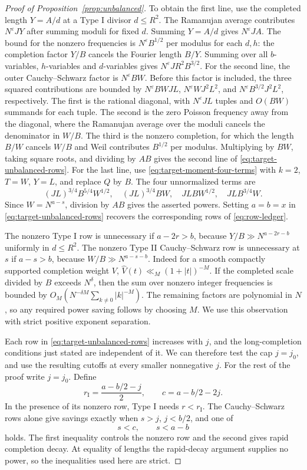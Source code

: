 \documentclass[11pt]{amsart}
\numberwithin{equation}{section}
\theoremstyle{remark}
\begin{document}
\begin{proof}[Proof of Proposition~\ref{prop:unbalanced}]
To obtain the first line, use the completed length \(Y=A/d\) at a
Type I divisor \(d\le R^2\). The Ramanujan average contributes
\(N^\varepsilon JY\) after summing moduli for fixed \(d\). Summing
\(Y=A/d\) gives \(N^\varepsilon JA\). The bound for the nonzero frequencies
is \(N^\varepsilon B^{1/2}\) per modulus for each \(d,h\): the completion
factor \(Y/B\) cancels the Fourier length \(B/Y\). Summing over all
\(b\)-variables, \(h\)-variables and \(d\)-variables gives
\(N^\varepsilon JR^2B^{3/2}\).
For the second line, the outer Cauchy--Schwarz factor is
\(N^\varepsilon BW\). Before this factor is included, the three squared
contributions are bounded by \(N^\varepsilon BWJL\),
\(N^\varepsilon WJ^2L^2\), and \(N^\varepsilon B^{3/2}J^2L^2\),
respectively. The first is the rational diagonal, with
\(N^\varepsilon JL\) tuples and \(O(BW)\) summands for each tuple.
The second is the zero Poisson frequency away from the diagonal,
where the Ramanujan average over the moduli cancels the denominator
in \(W/B\). The third is the nonzero completion, for which the
length \(B/W\) cancels \(W/B\) and Weil contributes \(B^{1/2}\) per
modulus. Multiplying by \(BW\), taking square roots, and dividing by
\(AB\) gives the second line of \eqref{eq:target-unbalanced-rows}.
For the last line, use \eqref{eq:target-moment-four-terms} with
\(k=2\), \(T=W\), \(Y=L\), and replace \(Q\) by \(B\). The four
unnormalized terms are
\[
 (JL)^{3/4}B^{5/4}W^{1/2},\quad (JL)^{3/4}BW,\quad
 JLBW^{1/2},\quad JLB^{3/4}W.
\]
Since \(W=N^{a-s}\), division by \(AB\) gives the asserted powers.
Setting \(a=b=x\) in \eqref{eq:target-unbalanced-rows} recovers
the corresponding rows of \eqref{eq:row-ledger}.

The nonzero Type I row is unnecessary if \(a-2r>b\), because
\(Y/B\gg N^{a-2r-b}\) uniformly in \(d\le R^2\).
The nonzero Type II Cauchy--Schwarz row is unnecessary at \(s\) if
\(a-s>b\), because \(W/B\gg N^{a-s-b}\).
Indeed for a smooth compactly supported completion weight \(V\),
\(\widehat V(t)\ll_M(1+|t|)^{-M}\). If the completed scale divided
by \(B\) exceeds \(N^\delta\), then the sum over nonzero integer
frequencies is bounded by \(O_M(N^{-\delta M}\sum_{k\ne0}|k|^{-M})\).
The remaining factors are polynomial in \(N\), so any required
power saving follows by choosing \(M\). We use this observation with
strict positive exponent separation.

Each row in \eqref{eq:target-unbalanced-rows} increases with \(j\),
and the long-completion conditions just stated are independent of it.
We can therefore test the cap \(j=j_0\), and use the resulting cutoffs
at every smaller nonnegative \(j\). For the rest of the proof write
\(j=j_0\). Define
\[
 r_{\mathrm I}=\frac{a-b/2-j}{2},\qquad c=a-b/2-2j .
\]
In the presence of its nonzero row, Type I needs \(r<r_{\mathrm I}\).
The Cauchy--Schwarz rows alone give savings exactly when \(s>j\),
\(j<b/2\), and one of
\[
                  s<c,\qquad s<a-b
\]
holds. The first inequality controls the nonzero row and the second
gives rapid completion decay. At equality of lengths the rapid-decay
argument supplies no power, so the inequalities used here are strict.


\end{proof}
\end{document}
